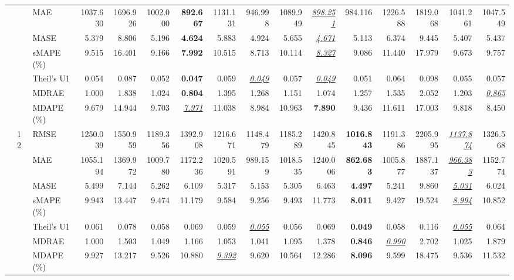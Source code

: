 \begin{table}[!htbp]
{\begin{tabular}{lllrrrrrrrrrrrrr}
 &  & MAE & 1037.630 & 1696.926 & 1002.000 & \textbf{892.667} & 1131.131 & 946.998 & 1089.949 & \underline{\textit{898.251}} & 984.116 & 1226.588 & 1819.068 & 1041.261 & 1047.549 \\
 &  & MASE & 5.379 & 8.806 & 5.196 & \textbf{4.624} & 5.883 & 4.924 & 5.655 & \underline{\textit{4.671}} & 5.113 & 6.374 & 9.445 & 5.407 & 5.437 \\
 &  & sMAPE (\%) & 9.515 & 16.401 & 9.166 & \textbf{7.992} & 10.515 & 8.713 & 10.114 & \underline{\textit{8.327}} & 9.086 & 11.440 & 17.979 & 9.673 & 9.757 \\
 &  & Theil's U1 & 0.054 & 0.087 & 0.052 & \textbf{0.047} & 0.059 & \underline{\textit{0.049}} & 0.057 & \underline{\textit{0.049}} & 0.051 & 0.064 & 0.098 & 0.055 & 0.057 \\
 &  & MDRAE & 1.000 & 1.838 & 1.024 & \textbf{0.804} & 1.395 & 1.268 & 1.151 & 1.074 & 1.257 & 1.535 & 2.052 & 1.203 & \underline{\textit{0.865}} \\
 &  & MDAPE (\%) & 9.679 & 14.944 & 9.703 & \underline{\textit{7.971}} & 11.038 & 8.984 & 10.963 & \textbf{7.890} & 9.436 & 11.611 & 17.003 & 9.818 & 8.450 \\
\cmidrule(lr){2-16}
 & 12 & RMSE & 1250.039 & 1550.959 & 1189.356 & 1392.908 & 1216.671 & 1148.479 & 1185.289 & 1420.845 & \textbf{1016.843} & 1191.386 & 2205.995 & \underline{\textit{1137.874}} & 1326.568 \\
 &  & MAE & 1055.194 & 1369.972 & 1009.780 & 1172.236 & 1020.591 & 989.159 & 1018.535 & 1240.006 & \textbf{862.683} & 1005.877 & 1887.137 & \underline{\textit{966.383}} & 1152.774 \\
 &  & MASE & 5.499 & 7.144 & 5.262 & 6.109 & 5.317 & 5.153 & 5.305 & 6.463 & \textbf{4.497} & 5.241 & 9.860 & \underline{\textit{5.031}} & 6.024 \\
 &  & sMAPE (\%) & 9.943 & 13.447 & 9.474 & 11.179 & 9.584 & 9.256 & 9.493 & 11.773 & \textbf{8.011} & 9.427 & 19.524 & \underline{\textit{8.994}} & 10.852 \\
 &  & Theil's U1 & 0.061 & 0.078 & 0.058 & 0.069 & 0.059 & \underline{\textit{0.055}} & 0.056 & 0.069 & \textbf{0.049} & 0.058 & 0.116 & \underline{\textit{0.055}} & 0.064 \\
 &  & MDRAE & 1.000 & 1.503 & 1.049 & 1.166 & 1.053 & 1.041 & 1.095 & 1.378 & \textbf{0.846} & \underline{\textit{0.990}} & 2.702 & 1.025 & 1.879 \\
 &  & MDAPE (\%) & 9.927 & 13.217 & 9.526 & 10.880 & \underline{\textit{9.392}} & 9.620 & 10.564 & 12.286 & \textbf{8.096} & 9.599 & 18.475 & 9.536 & 11.532 \\

\end{tabular}}
\end{table}
